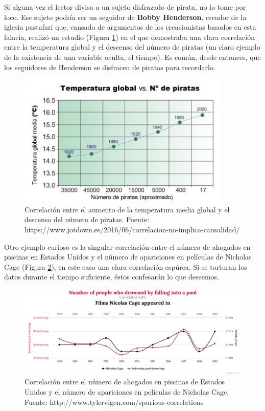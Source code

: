 \documentclass[
  12pt,
  spanish,
  a4paperpaper,
]{report}
\begin{document}
Si alguna vez el lector divisa a un sujeto disfrazado de pirata, no lo
tome por loco. Ese sujeto podría ser un seguidor de \textbf{Bobby
Henderson}, creador de la iglesia pastafari que, cansado de argumentos
de los creacionistas basados en esta falacia, realizó un estudio (Figura
\ref{piratas}) en el que demostraba una clara correlación entre la
temperatura global y el descenso del número de piratas (un claro ejemplo
de la existencia de una variable oculta, el tiempo). Es común, desde
entonces, que los seguidores de Henderson se disfracen de piratas para
recordarlo.

\begin{figure}
\centering
\includegraphics[width=0.9\textwidth,height=\textheight]{source/figures/piratas.jpg}
\caption{Correlación entre el aumento de la temperatura media global y
el descenso del número de piratas. Fuente:
https://www.jotdown.es/2016/06/correlacion-no-implica-causalidad/
\label{piratas}}
\end{figure}

Otro ejemplo curioso es la singular correlación entre el número de
ahogados en piscinas en Estados Unidos y el número de apariciones en
películas de Nicholas Cage (Figura \ref{cage}), en este caso una clara
correlación espúrea. Si se torturan los datos durante el tiempo
suficiente, éstos confesarán lo que deseemos.

\begin{figure}
\centering
\includegraphics[width=1\textwidth,height=\textheight]{source/figures/cage.pdf}
\caption{Correlación entre el número de ahogados en piscinas de Estados
Unidos y el número de apariciones en películas de Nicholas Cage. Fuente:
http://www.tylervigen.com/spurious-correlations \label{cage}}
\end{figure}
\end{document}

